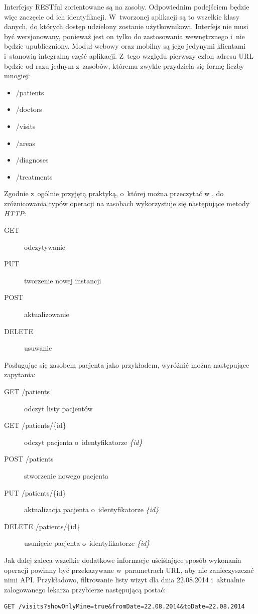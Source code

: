 \documentclass[11pt]{aghdpl}
\begin{document}
Interfejsy RESTful zorientowane są na zasoby. Odpowiednim podejściem będzie więc zaczęcie od ich identyfikacji. W~tworzonej aplikacji są to wszelkie klasy danych, do których dostęp udzielony zostanie użytkownikowi. Interfejs nie musi być wersjonowany, ponieważ jest on tylko do zastosowania wewnętrznego i~nie będzie upubliczniony. Moduł webowy oraz mobilny są jego jedynymi klientami i~stanowią integralną część aplikacji. Z~tego względu pierwszy człon adresu URL będzie od razu jednym z~zasobów, któremu zwykle przydziela się formę liczby mnogiej:
\begin{itemize}
	\item /patients
	\item /doctors
	\item /visits
	\item /areas
	\item /diagnoses
	\item /treatments
\end{itemize}

Zgodnie z~ogólnie przyjętą praktyką, o~której można przeczytać w \cite{WApiD}, do zróżnicowania typów operacji na zasobach wykorzystuje się następujące metody \emph{HTTP}:
\begin{description}
	\item[GET] odczytywanie
	\item[PUT] tworzenie nowej instancji
	\item[POST] aktualizowanie
	\item[DELETE] usuwanie
\end{description}

Posługując się zasobem pacjenta jako przykładem, wyróżnić można następujące zapytania:
\begin{description}
\item[GET /patients] odczyt listy pacjentów
\item[GET /patients/\{id\}] odczyt pacjenta o~identyfikatorze \emph{\{id\}}
\item[POST /patients] stworzenie nowego pacjenta
\item[PUT /patients/\{id\}] aktualizacja pacjenta o~identyfikatorze \emph{\{id\}}
\item[DELETE /patients/\{id\}] usunięcie pacjenta o~identyfikatorze \emph{\{id\}}
\end{description}

Jak dalej zaleca \cite{WApiD} wszelkie dodatkowe informacje uściślające sposób wykonania operacji powinny być przekazywane w~parametrach URL, aby nie zanieczyszczać nimi API. Przykładowo, filtrowanie listy wizyt dla dnia 22.08.2014 i~aktualnie zalogowanego lekarza przybierze następującą postać:
\begin{lstlisting}
GET /visits?showOnlyMine=true&fromDate=22.08.2014&toDate=22.08.2014
\end{lstlisting}
\end{document}
